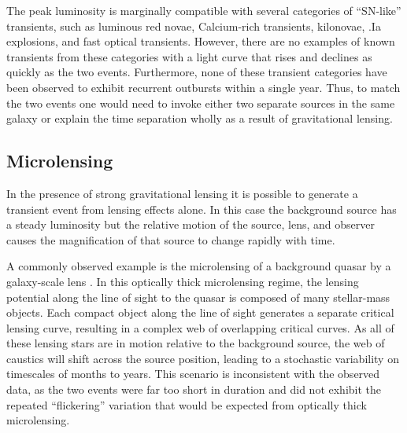 The peak luminosity is marginally compatible with several categories
of ``SN-like'' transients, such as luminous red novae, Calcium-rich
transients, kilonovae, .Ia explosions, and fast optical transients.
However, there are no examples of known transients from these
categories with a light curve that rises and declines as quickly as
the two \spock events.  Furthermore, none of these transient
categories have been observed to exhibit recurrent outbursts within a
single year. Thus, to match the two \spock events one would need to
invoke either two separate sources in the same galaxy or explain the
time separation wholly as a result of gravitational lensing.




\subsection{Microlensing}

In the presence of strong gravitational lensing it is possible to
generate a transient event from lensing effects alone.  In this case
the background source has a steady luminosity but the relative motion
of the source, lens, and observer causes the magnification of that
source to change rapidly with time.

A commonly observed example is the microlensing of a background quasar
by a galaxy-scale lens \citep{Wambsganss:2001, Kochanek:2004}.  In
this optically thick microlensing regime, the lensing potential along
the line of sight to the quasar is composed of many stellar-mass
objects.  Each compact object along the line of sight generates a
separate critical lensing curve, resulting in a complex web of
overlapping critical curves. As all of these lensing stars are in
motion relative to the background source, the web of caustics will
shift across the source position, leading to a stochastic variability
on timescales of months to years.  This scenario is inconsistent with
the observed data, as the two \spock events were far too short in
duration and did not exhibit the repeated ``flickering'' variation
that would be expected from optically thick microlensing.

